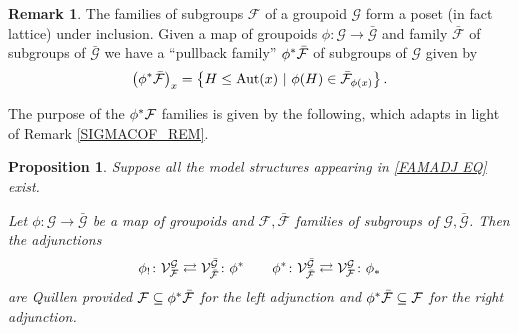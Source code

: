 \documentclass[a4paper,10pt
]{article}%
\numberwithin{equation}{section}
\numberwithin{figure}{section}
\newtheorem{proposition}[equation]{Proposition}%
\theoremstyle{definition} %
\newtheorem{remark}[equation]{Remark}%
\DeclareMathOperator{\Aut}{Aut}%
\newcommand{\F}{\ensuremath{\mathcal F}}
\newcommand{\V}{\ensuremath{\mathcal V}}
\newcommand{\G}{\ensuremath{\mathcal G}}
\newcommand{\1}{\ensuremath{\mathbbm 1}}%
\begin{document}
\begin{remark}\label{PULLFAM REM}
	The families of subgroups $\F$ of a groupoid $\G$ 
	form a poset (in fact lattice) under inclusion.
	Given a map of groupoids $\phi\colon \G \to \bar{\G}$
	and family $\bar{\F}$ of subgroups of $\bar{\G}$
	we have a ``pullback family'' 
	$\phi^{\**} \bar{\F}$ 
	of subgroups of $\G$ given by
	\begin{equation}
	\label{PHISTAR_EQ}
	\left(\phi^{\**} \bar{\F} \right)_{x}
	=
	\left\{H \leq \Aut(x) \ | \ \phi(H) \in \bar{\F}_{\phi(x)}\right\}.
	\end{equation}
\end{remark}



The purpose of the $\phi^{\**} \mathcal{F}$ families is given by the following,
which adapts \cite[Props. 6.5, 6.6]{BP21}
in light of Remark \ref{SIGMACOF_REM}.


\begin{proposition}\label{EQQUILADJ PROP}
	Suppose all the model structures appearing in \eqref{FAMADJ EQ} exist.
	
	Let $\phi \colon \G \to \bar{\G}$
	be a map of groupoids and
	$\F,\bar{\F}$ families of subgroups of $\G,\bar{\G}$.
	Then the adjunctions
	\begin{equation}\label{FAMADJ EQ}
	\phi_! \colon \V^{\G}_{\F}
	\rightleftarrows
	\V^{\bar{\G}}_{\bar{\F}} \colon \phi^{\**}
	\qquad
	\phi^{\**} \colon \V^{\bar{\G}}_{\bar{\F}} 
	\rightleftarrows
	\V^{\G}_{\F} \colon \phi_{\**}
	\end{equation}
	are Quillen provided
	$\F \subseteq \phi^{\**} \bar{\F}$
	for the left adjunction and 
	$\phi^{\**} \bar{\F} \subseteq \F$
	for the right adjunction.
\end{proposition}
\end{document}
